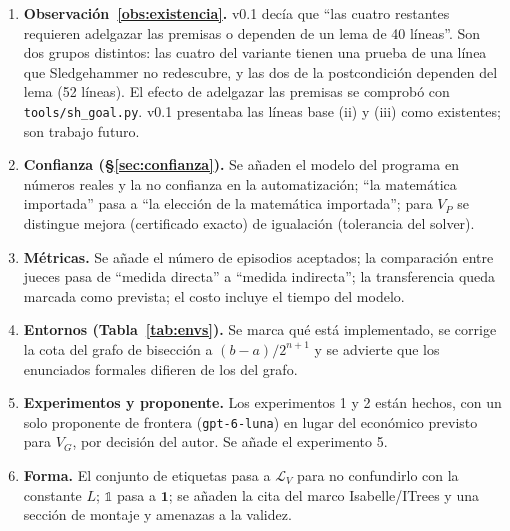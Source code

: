 \documentclass[11pt,a4paper]{article}
\theoremstyle{definition}
\theoremstyle{remark}
\begin{document}
\begin{enumerate}
  \item \textbf{Observación~\ref{obs:existencia}.} v0.1 decía que ``las cuatro restantes requieren adelgazar las premisas o dependen de un lema de 40 líneas''. Son dos grupos distintos: las cuatro del variante tienen una prueba de una línea que Sledgehammer no redescubre, y las dos de la postcondición dependen del lema (52 líneas). El efecto de adelgazar las premisas se comprobó con \texttt{tools/sh\_goal.py}. v0.1 presentaba las líneas base (ii) y (iii) como existentes; son trabajo futuro.
  \item \textbf{Confianza (§\ref{sec:confianza}).} Se añaden el modelo del programa en números reales y la no confianza en la automatización; ``la matemática importada'' pasa a ``la elección de la matemática importada''; para $V_P$ se distingue mejora (certificado exacto) de igualación (tolerancia del solver).
  \item \textbf{Métricas.} Se añade el número de episodios aceptados; la comparación entre jueces pasa de ``medida directa'' a ``medida indirecta''; la transferencia queda marcada como prevista; el costo incluye el tiempo del modelo.
  \item \textbf{Entornos (Tabla~\ref{tab:envs}).} Se marca qué está implementado, se corrige la cota del grafo de bisección a $(b-a)/2^{n+1}$ y se advierte que los enunciados formales difieren de los del grafo.
  \item \textbf{Experimentos y proponente.} Los experimentos 1 y 2 están hechos, con un solo proponente de frontera (\texttt{gpt-6-luna}) en lugar del económico previsto para $V_G$, por decisión del autor. Se añade el experimento 5.
  \item \textbf{Forma.} El conjunto de etiquetas pasa a $\mathcal{L}_V$ para no confundirlo con la constante $L$; $\mathbb{1}$ pasa a $\mathbf{1}$; se añaden la cita del marco Isabelle/ITrees y una sección de montaje y amenazas a la validez.
\end{enumerate}


\end{document}

